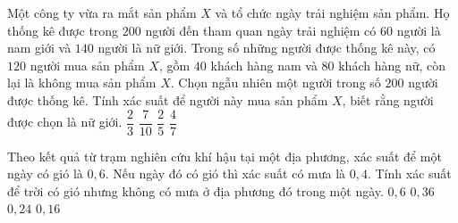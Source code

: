 \begin{ex}%
    Một công ty vừa ra mắt sản phẩm $X$ và tổ chức ngày trải nghiệm sản phẩm. Họ thống kê được trong $200$ người đến tham quan ngày trải nghiệm có $60$ người là nam giới và $140$ người là nữ giới. Trong số những người được thống kê này, có $120$ người mua sản phẩm $X$, gồm $40$ khách hàng nam và $80$ khách hàng nữ, còn lại là không mua sản phẩm $X$. Chọn ngẫu nhiên một người trong số $200$ người được thống kê. Tính xác suất để người này mua sản phẩm $X$, biết rằng người được chọn là nữ giới.
    \choice
    {$\dfrac{2}{3}$}
    {$\dfrac{7}{10}$}
    {$\dfrac{2}{5}$}
    {\True $\dfrac{4}{7}$}
\end{ex}

\begin{ex}%
    Theo kết quả từ trạm nghiên cứu khí hậu tại một địa phương, xác suất để một ngày có gió là $0{,}6$. Nếu ngày đó có gió thì xác suất có mưa là $0{,}4$. Tính xác suất để trời có gió nhưng không có mưa ở địa phương đó trong một ngày.
    \choice
    {$0{,}6$}
    {\True $0{,}36$}
    {$0{,}24$}
    {$0{,}16$}
\end{ex}

